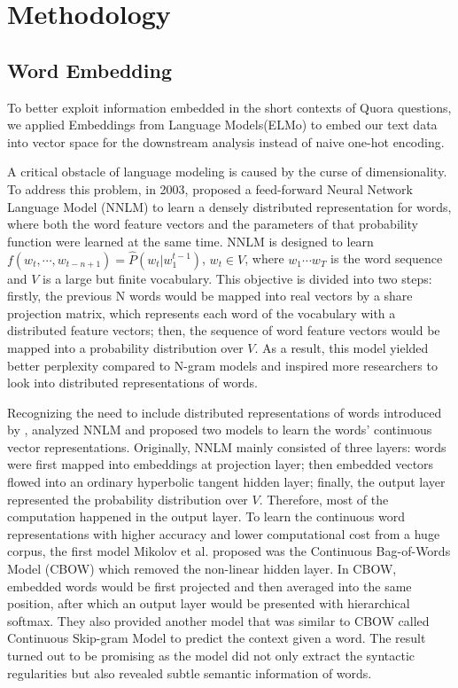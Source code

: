 \documentclass[12pt]{diazessay} %
\begin{document}
\section{Methodology}
\subsection{Word Embedding}

To better exploit information embedded in the short contexts of Quora questions, we applied Embeddings from Language Models(ELMo) to embed our text data into vector space for the downstream analysis instead of naive one-hot encoding.

A critical obstacle of language modeling is caused by the curse of dimensionality. To address this problem, in 2003, \citet{bengio2003neural} proposed a feed-forward Neural Network Language Model (NNLM) to learn a densely distributed representation\citep{hinton1986learning} for words, where both the word feature vectors and the parameters of that probability function were learned at the same time. NNLM is designed to learn $f \left( w _ { t } , \cdots , w _ { t - n + 1 } \right) = \hat { P } \left( w _ { t } | w _ { 1 } ^ { t - 1 } \right)$, $w _ { t } \in V$, where $w_1 \cdots w_T$ is the word sequence and $V$ is a large but finite vocabulary. This objective is divided into two steps: firstly, the previous N words would be mapped into real vectors by a share projection matrix, which represents each word of the vocabulary with a distributed feature vectors; then, the sequence of word feature vectors would be mapped into a probability distribution over $V$. As a result, this model yielded better perplexity compared to N-gram models and inspired more researchers to look into distributed representations of words.

Recognizing the need to include distributed representations of words introduced by \citet{hinton1984distributed}, \citet{mikolov2013efficient} analyzed NNLM and proposed two models to learn the words' continuous vector representations. Originally, NNLM mainly consisted of three layers: words were first mapped into embeddings at projection layer; then embedded vectors flowed into an ordinary hyperbolic tangent hidden layer; finally, the output layer represented the probability distribution over $V$. Therefore, most of the computation happened in the output layer. To learn the continuous word representations with higher accuracy and lower computational cost from a huge corpus, the first model Mikolov et al. proposed was the Continuous Bag-of-Words Model (CBOW) which removed the non-linear hidden layer. In CBOW, embedded words would be first projected and then averaged into the same position, after which an output layer would be presented with hierarchical softmax. They also provided another model that was similar to CBOW called Continuous Skip-gram Model to predict the context given a word. The result turned out to be promising as the model did not only extract the syntactic regularities but also revealed subtle semantic information of words.
\end{document}
